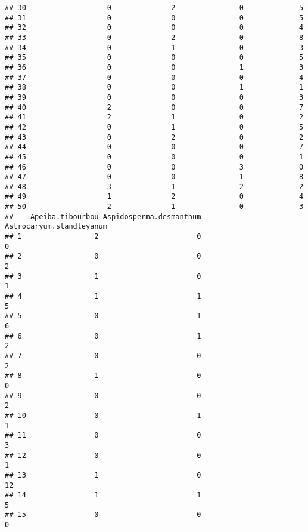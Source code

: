 \documentclass[
]{article}
\begin{document}
\begin{verbatim}
## 30                   0              2               0             5
## 31                   0              0               0             5
## 32                   0              0               0             4
## 33                   0              2               0             8
## 34                   0              1               0             3
## 35                   0              0               0             5
## 36                   0              0               1             3
## 37                   0              0               0             4
## 38                   0              0               1             1
## 39                   0              0               0             3
## 40                   2              0               0             7
## 41                   2              1               0             2
## 42                   0              1               0             5
## 43                   0              2               0             2
## 44                   0              0               0             7
## 45                   0              0               0             1
## 46                   0              0               3             0
## 47                   0              0               1             8
## 48                   3              1               2             2
## 49                   1              2               0             4
## 50                   2              1               0             3
##    Apeiba.tibourbou Aspidosperma.desmanthum Astrocaryum.standleyanum
## 1                 2                       0                        0
## 2                 0                       0                        2
## 3                 1                       0                        1
## 4                 1                       1                        5
## 5                 0                       1                        6
## 6                 0                       1                        2
## 7                 0                       0                        2
## 8                 1                       0                        0
## 9                 0                       0                        2
## 10                0                       1                        1
## 11                0                       0                        3
## 12                0                       0                        1
## 13                1                       0                       12
## 14                1                       1                        5
## 15                0                       0                        0

\end{verbatim}
\end{document}
